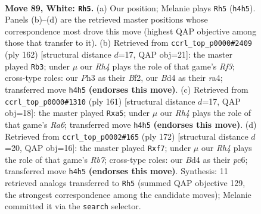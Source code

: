 \documentclass[11pt]{article}
\begin{document}
\clearpage

\begin{figure}[p]\centering
\begin{subfigure}{0.46\textwidth}\centering
\resizebox{\linewidth}{!}{%
\newchessgame
\chessboard[
  setfen={6k1/8/4r3/8/3Bp2R/1K3p1P/5P2/8 w - - 3 89},
  showmover=false,
  pgfstyle=straightmove, color=movearrow, markmove={h4-h5}
]}
\caption{}
\end{subfigure}\hfill
\begin{subfigure}{0.46\textwidth}\centering
\resizebox{\linewidth}{!}{%
\newchessgame
\chessboard[
  setfen={8/8/5pk1/4p3/r6P/5R2/5B1K/8 w - - 53 82},
  showmover=false,
  pgfstyle=straightmove, color=movearrow, markmove={f3-b3}
]}
\caption{}
\end{subfigure}
\\[4pt]
\begin{subfigure}{0.46\textwidth}\centering
\resizebox{\linewidth}{!}{%
\newchessgame
\chessboard[
  setfen={8/8/1P5R/P2k1p2/8/r6p/3K4/8 b - - 0 81},
  showmover=false,
  pgfstyle=straightmove, color=movearrow, markmove={a3-a5}
]}
\caption{}
\end{subfigure}\hfill
\begin{subfigure}{0.46\textwidth}\centering
\resizebox{\linewidth}{!}{%
\newchessgame
\chessboard[
  setfen={8/1R3p2/2p3p1/2P1k3/7r/P2K4/1P6/8 w - - 0 87},
  showmover=false,
  pgfstyle=straightmove, color=movearrow, markmove={b7-f7}
]}
\caption{}
\end{subfigure}
\caption{\textbf{Move 89, White: \texttt{Rh5}.} (a) Our position; Melanie plays \texttt{Rh5} (\texttt{h4h5}). Panels (b)--(d) are the retrieved master positions whose correspondence most drove this move (highest QAP objective among those that transfer to it). (b) Retrieved from \texttt{ccrl\_top\_p0000\#2409} (ply 162) [structural distance $d$=17, QAP obj=21]: the master played \texttt{Rb3}; under $\mu$ our \emph{Rh4} plays the role of that game's \emph{Rf3}; cross-type roles: our \emph{P}h3 as their \emph{B}f2, our \emph{B}d4 as their \emph{r}a4; transferred move \texttt{h4h5} \textbf{(endorses this move)}. (c) Retrieved from \texttt{ccrl\_top\_p0000\#1310} (ply 161) [structural distance $d$=17, QAP obj=18]: the master played \texttt{Rxa5}; under $\mu$ our \emph{Rh4} plays the role of that game's \emph{Ra6}; transferred move \texttt{h4h5} \textbf{(endorses this move)}. (d) Retrieved from \texttt{ccrl\_top\_p0002\#165} (ply 172) [structural distance $d$=20, QAP obj=16]: the master played \texttt{Rxf7}; under $\mu$ our \emph{Rh4} plays the role of that game's \emph{Rb7}; cross-type roles: our \emph{B}d4 as their \emph{p}c6; transferred move \texttt{h4h5} \textbf{(endorses this move)}. Synthesis: 11 retrieved analogs transferred to \texttt{Rh5} (summed QAP objective 129, the strongest correspondence among the candidate moves); Melanie committed it via the \texttt{search} selector.}
\label{fig:thought-m176}
\end{figure}
\end{document}
